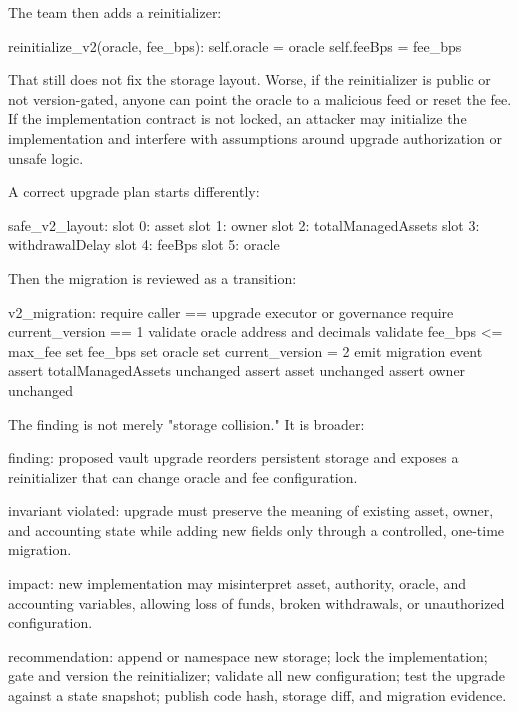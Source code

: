 The team then adds a reinitializer:

\begin{codeblock}
reinitialize_v2(oracle, fee_bps):
    self.oracle = oracle
    self.feeBps = fee_bps
\end{codeblock}

That still does not fix the storage layout. Worse, if the reinitializer is public or not version-gated, anyone can point the oracle to a malicious feed or reset the fee. If the implementation contract is not locked, an attacker may initialize the implementation and interfere with assumptions around upgrade authorization or unsafe logic.

A correct upgrade plan starts differently:

\begin{codeblock}
safe_v2_layout:
    slot 0: asset
    slot 1: owner
    slot 2: totalManagedAssets
    slot 3: withdrawalDelay
    slot 4: feeBps
    slot 5: oracle
\end{codeblock}

Then the migration is reviewed as a transition:

\begin{codeblock}
v2_migration:
    require caller == upgrade executor or governance
    require current_version == 1
    validate oracle address and decimals
    validate fee_bps <= max_fee
    set fee_bps
    set oracle
    set current_version = 2
    emit migration event
    assert totalManagedAssets unchanged
    assert asset unchanged
    assert owner unchanged
\end{codeblock}

The finding is not merely "storage collision." It is broader:

\begin{codeblock}
finding:
    proposed vault upgrade reorders persistent storage and exposes a
    reinitializer that can change oracle and fee configuration.

invariant violated:
    upgrade must preserve the meaning of existing asset, owner, and
    accounting state while adding new fields only through a controlled,
    one-time migration.

impact:
    new implementation may misinterpret asset, authority, oracle, and
    accounting variables, allowing loss of funds, broken withdrawals, or
    unauthorized configuration.

recommendation:
    append or namespace new storage;
    lock the implementation;
    gate and version the reinitializer;
    validate all new configuration;
    test the upgrade against a state snapshot;
    publish code hash, storage diff, and migration evidence.
\end{codeblock}

